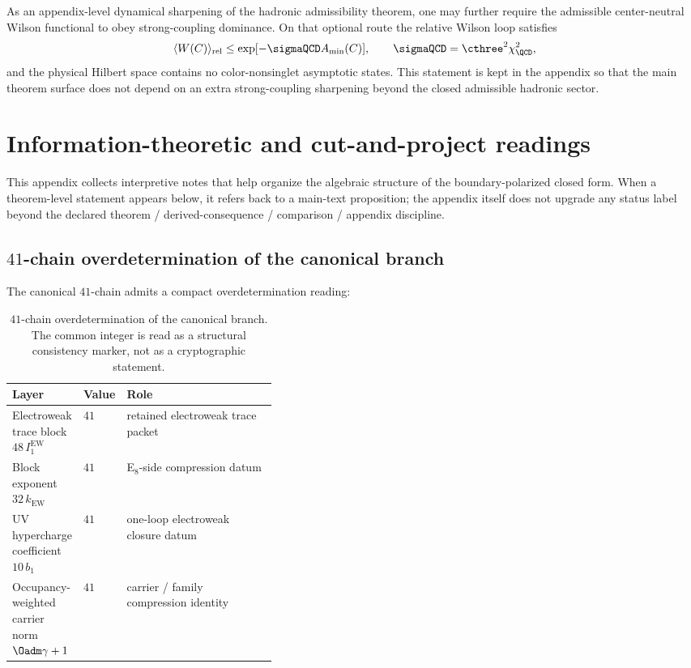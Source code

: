 As an appendix-level dynamical sharpening of the hadronic admissibility theorem, one may further require the
admissible center-neutral Wilson functional to obey strong-coupling dominance. On that optional
route the relative Wilson loop satisfies
\[
\langle W(C)\rangle_{\mathrm{rel}}
\le
\exp[-\sigmaQCD A_{\min}(C)],
\qquad
\sigmaQCD=\cthree^2\chi_{\QCD}^2,
\]
and the physical Hilbert space contains no color-nonsinglet asymptotic states. This statement is
kept in the appendix so that the main theorem surface does not depend on an extra strong-coupling
sharpening beyond the closed admissible hadronic sector.

\section{Information-theoretic and cut-and-project readings}
\label{app:info-readings}

This appendix collects interpretive notes that help organize the algebraic structure of the
boundary-polarized closed form. When a theorem-level statement appears below, it refers back to a
main-text proposition; the appendix itself does not upgrade any status label beyond the declared
theorem / derived-consequence / comparison / appendix discipline.

\subsection{\texorpdfstring{$41$}{41}-chain overdetermination of the canonical branch}

The canonical $41$-chain admits a compact overdetermination reading:

\begin{table}[H]
\centering
\small
\begin{tabularx}{\linewidth}{@{}>{\raggedright\arraybackslash}p{0.26\linewidth}>{\raggedleft\arraybackslash}p{0.12\linewidth}Y@{}}
\toprule
Layer & Value & Role \\
\midrule
Electroweak trace block $48\,I_1^{\mathrm{EW}}$ & $41$ & retained electroweak trace packet \\
Block exponent $32\,k_{\mathrm{EW}}$ & $41$ & E$_8$-side compression datum \\
UV hypercharge coefficient $10\,b_1$ & $41$ & one-loop electroweak closure datum \\
Occupancy-weighted carrier norm $\Oadm\gamma+1$ & $41$ & carrier / family compression identity \\
\bottomrule
\end{tabularx}
\caption{$41$-chain overdetermination of the canonical branch. The common integer is read as a
structural consistency marker, not as a cryptographic statement.}
\label{tab:checksum-41}
\end{table}

